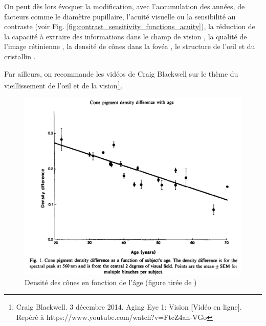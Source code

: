 	\par On peut dès lors évoquer la modification, avec l'accumulation des années, de facteurs comme le diamètre pupillaire, l'acuité visuelle ou la sensibilité au contraste \citep{owsley_contrast_1983} (voir Fig. \ref{fig:contrast_sensitivity_functions_acuity}), la réduction de la capacité à extraire des informations dans le champ de vision \citep{sekuler_effects_2000,ball_age_1988,roge_influence_2004, roge_deterioration_2009,gross_human_2008}, la qualité de l'image rétinienne \citep{artal_effects_1993}, la densité de cônes dans la fovéa \citep{kilbride_foveal_1986}, le structure de l'œil et du cristallin \citep{cook_aging_1994}.
	
	\par Par ailleurs, on recommande les vidéos de Craig Blackwell sur le thème du vieillissement de l'œil et de la vision\footnote{Craig Blackwell. 3 décembre 2014. Aging Eye 1: Vision [Vidéo en ligne]. Repéré à https://www.youtube.com/watch?v=FtcZ4an-VGo}.
	
	\begin{figure}
		\centering
		\includegraphics[scale=.5]{Figures/ConeDensityAge}
		\caption{Densité des cônes en fonction de l'âge (figure tirée de \citep{kilbride_foveal_1986})}
		\label{fig:densite_cones_age}
	\end{figure}